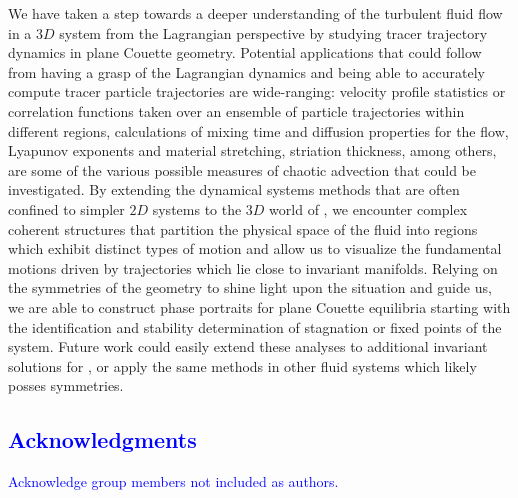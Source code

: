 \documentclass[letter,12pt,openany]{article}
\begin{document}
We have taken a step towards a deeper understanding of the  turbulent 
fluid flow in a $3D$ system from the Lagrangian perspective by studying 
tracer trajectory dynamics in plane Couette geometry. Potential 
applications that could follow from having a grasp of the Lagrangian 
dynamics and being able to accurately compute tracer particle 
trajectories are wide-ranging: velocity profile statistics or correlation 
functions taken over an ensemble of particle trajectories within 
different regions, calculations of mixing time and diffusion properties 
for the flow, Lyapunov exponents and material stretching, striation 
thickness, among others, are some of the various possible measures of 
chaotic advection that could be investigated. By extending the dynamical 
systems methods that are often confined to simpler $2D$ systems to the 
$3D$ world of {\pCf}, we encounter complex coherent structures that 
partition the physical space of the fluid into regions which exhibit 
distinct types of motion and allow us to visualize the fundamental 
motions driven by trajectories which lie close to invariant manifolds. 
Relying on the symmetries of the geometry to shine light upon the 
situation and guide us, we are able to construct phase portraits for 
plane Couette equilibria starting with the identification and stability 
determination of stagnation or fixed points of the system. Future work 
could easily extend these analyses to additional invariant solutions for 
{\pCf}, or apply the same methods in other fluid systems which likely 
posses symmetries. 

\ifboyscout
        \textcolor{blue}{
\section{Acknowledgments}
Acknowledge group members not included as authors.
        } %
\fi


\end{document}
